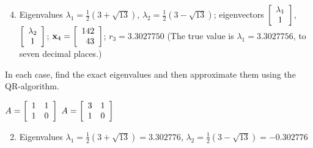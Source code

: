 \begin{multicols}{2}
\begin{ex}
\begin{sol}
\begin{enumerate}[label={\alph*.}]
\setcounter{enumi}{3}
\item Eigenvalues $\lambda_{1} = \frac{1}{2}(3 + \sqrt{13})$, $\lambda_{2} = \frac{1}{2}(3 - \sqrt{13})$;
eigenvectors $\left[ \begin{array}{c}
\lambda_{1}  \\
1
\end{array}\right]$,
$\left[ \begin{array}{c}
\lambda_{2}  \\
1
\end{array}\right]$;
$\textbf{x}_{4} = \left[ \begin{array}{rr}
142  \\
43
\end{array}\right]$;
$r_{3} = 3.3027750$
(The true value is $\lambda_{1} = 3.3027756$, to seven decimal places.)
\end{enumerate}
\end{sol}
\end{ex}

\begin{ex}
In each case, find the exact eigenvalues and then approximate them using the QR-algorithm.


\begin{exenumerate}
\exitem $A = \left[ \begin{array}{rr}
1 & 1 \\
1 & 0
\end{array}\right]$
\exitem $A = \left[ \begin{array}{rr}
3 & 1 \\
1 & 0
\end{array}\right]$
\end{exenumerate}
\begin{sol}
\begin{enumerate}[label={\alph*.}]
\setcounter{enumi}{1}
\item  Eigenvalues $\lambda_{1} = \frac{1}{2}(3 + \sqrt{13}) = 3.302776$, $\lambda_{2} = \frac{1}{2}(3 - \sqrt{13}) = -0.302776$


\end{enumerate}
\end{sol}
\end{ex}
\end{multicols}
